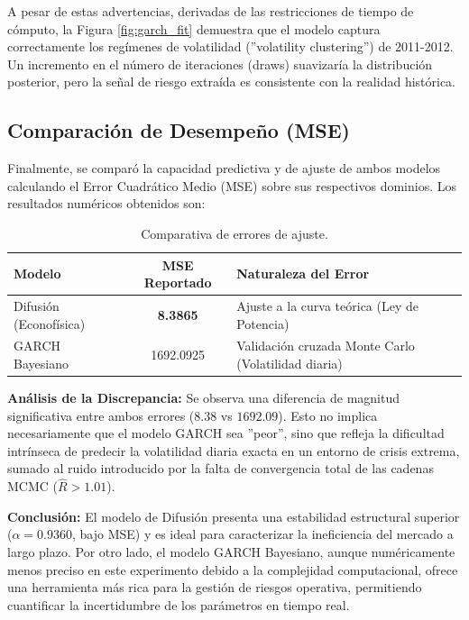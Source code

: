 A pesar de estas advertencias, derivadas de las restricciones de tiempo de cómputo, la Figura \ref{fig:garch_fit} demuestra que el modelo captura correctamente los regímenes de volatilidad (''volatility clustering'') de 2011-2012. Un incremento en el número de iteraciones (draws) suavizaría la distribución posterior, pero la señal de riesgo extraída es consistente con la realidad histórica.

\subsection{Comparación de Desempeño (MSE)}

Finalmente, se comparó la capacidad predictiva y de ajuste de ambos modelos calculando el Error Cuadrático Medio (MSE) sobre sus respectivos dominios. Los resultados numéricos obtenidos son:

\begin{table}[h!]
\centering
\begin{tabular}{|l|c|l|}
\hline
\textbf{Modelo} & \textbf{MSE Reportado} & \textbf{Naturaleza del Error} \\ \hline
Difusión (Econofísica) & \textbf{8.3865} & Ajuste a la curva teórica (Ley de Potencia) \\ \hline
GARCH Bayesiano & 1692.0925 & Validación cruzada Monte Carlo (Volatilidad diaria) \\ \hline
\end{tabular}
\caption{Comparativa de errores de ajuste.}
\label{tab:mse_results}
\end{table}

\textbf{Análisis de la Discrepancia:}
Se observa una diferencia de magnitud significativa entre ambos errores ($8.38$ vs $1692.09$). Esto no implica necesariamente que el modelo GARCH sea ''peor'', sino que refleja la dificultad intrínseca de predecir la volatilidad diaria exacta en un entorno de crisis extrema, sumado al ruido introducido por la falta de convergencia total de las cadenas MCMC ($\hat{R} > 1.01$).

\textbf{Conclusión:}
El modelo de Difusión \cite{Alvarez2002} presenta una estabilidad estructural superior ($\alpha=0.9360$, bajo MSE) y es ideal para caracterizar la ineficiencia del mercado a largo plazo. Por otro lado, el modelo GARCH Bayesiano, aunque numéricamente menos preciso en este experimento debido a la complejidad computacional, ofrece una herramienta más rica para la gestión de riesgos operativa, permitiendo cuantificar la incertidumbre de los parámetros en tiempo real.